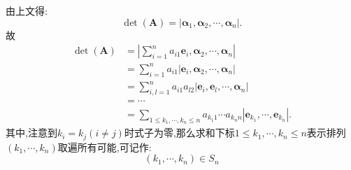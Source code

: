 \begin{formal}
\begin{theorem}[组合定义推导]\label{thm:组合定义推导}
由上文得:
\[
 \det\left(\bm{A}\right) = 
\left|\bm{\alpha }_1,\bm{\alpha }_2,
\cdots,\bm{\alpha }_n \right|.
\]
故
\begin{align*}
 \det\left(\bm{A}\right) & =
 \left|\sum_{i = 1}^n
a_{i1}\bm{e}_i,\bm{\alpha }_2,
\cdots,\bm{\alpha }_n \right|\\
&=\sum_{i =1}^n a_{i1}\left|\bm{e}_i,
\bm{\alpha }_2,\cdots,\bm{\alpha }_n\right|\\
&=\sum_{i,l=1}^n a_{i1}a_{l2} 
\left|\bm{e}_i,
\bm{e}_l,\cdots,\bm{\alpha }_n\right|\\
&=\cdots\\
&=\sum_{1 \leqslant k_1,
\cdots,k_n \leqslant n}
a_{k_{1}1} \cdots a_{k_{n}n}\left|
    \bm{e}_{k_1},\cdots,\bm{e}_{k_n}
\right|.
\end{align*}
其中,注意到$k_i=k_j\left(i\neq j\right)$时式子为零,那么求和下标$1 \leqslant k_1,\cdots,k_n \leqslant n
$表示排列$\left(k_1,\cdots,k_n\right)$取遍所有可能,可记作:
\[
\left(k_1,\cdots,k_n\right) \in S_n
\]
\end{theorem}
\end{formal}

